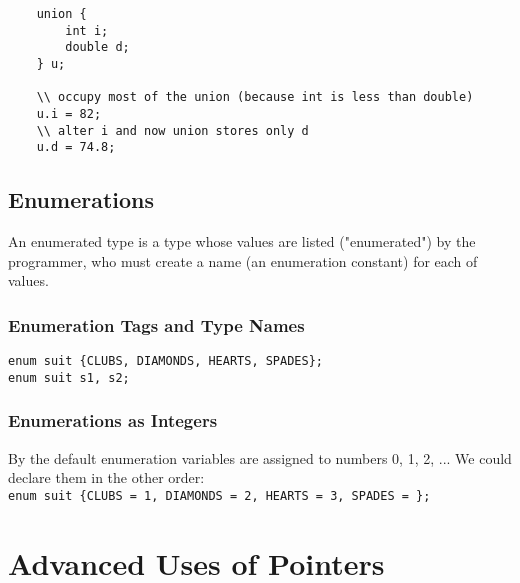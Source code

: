 \documentclass[openany]{book}
\begin{document}
    \begin{lstlisting}
    union {
        int i;
        double d;
    } u;

    \\ occupy most of the union (because int is less than double)
    u.i = 82;
    \\ alter i and now union stores only d
    u.d = 74.8;
    \end{lstlisting}

    \section{Enumerations} 
    An enumerated type is a type whose values are listed ("enumerated") by the programmer, who must create a name (an enumeration constant) for each of values.
    
    \subsection*{Enumeration Tags and Type Names}

    \texttt{enum suit \{CLUBS, DIAMONDS, HEARTS, SPADES\};} \\
    \texttt{enum suit s1, s2;}

    \subsection*{Enumerations as Integers}
    By the default enumeration variables are assigned to numbers 0, 1, 2, ... We could declare them in the other order: \\
    \texttt{enum suit \{CLUBS = 1, DIAMONDS = 2, HEARTS = 3, SPADES = \};} \\



    \chapter{Advanced Uses of Pointers}
\end{document}
